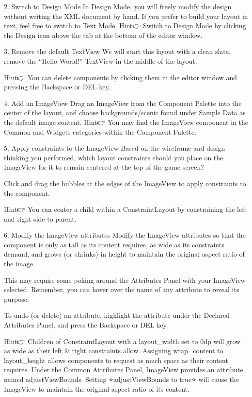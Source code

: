     2. Switch to Design Mode
        In Design Mode, you will freely modify the design without writing the XML document by hand. If you prefer to build your layout in text, feel free to switch to Text Mode.
        Hint👉 Switch to Design Mode by clicking the Design icon above the tab at the bottom of the editor window.

    3. Remove the default TextView
        We will start this layout with a clean slate, remove the “Hello World!” TextView in the middle of the layout.

        Hint👉 You can delete components by clicking them in the editor window and pressing the Backspace or DEL key.

    4. Add an ImageView
        Drag an ImageView from the Component Palette into the center of the layout, and choose backgrounds/scenic found under Sample Data as the default image content.
        Hint👉 You may find the ImageView component in the Common and Widgets categories within the Component Palette.

    5. Apply constraints to the ImageView
        Based on the wireframe and design thinking you performed, which layout constraints should you place on the ImageView for it to remain centered at the top of the game screen?

        Click and drag the bubbles at the edges of the ImageView to apply constraints to the component.

        Hint👉 You can center a child within a ConstraintLayout by constraining the left and right side to parent.

    6. Modify the ImageView attributes
        Modify the ImageView attributes so that the component is only as tall as its content requires, as wide as its constraints demand, and grows (or shrinks) in height to maintain the original aspect ratio of the image.

        This may require some poking around the Attributes Panel with your ImageView selected. Remember, you can hover over the name of any attribute to reveal its purpose.

        To undo (or delete) an attribute, highlight the attribute under the Declared Attributes Panel, and press the Backspace or DEL key.

        Hint👉 Children of ConstraintLayout with a layout_width set to 0dp will grow as wide as their left & right constraints allow.
        Assigning wrap_content to layout_height allows components to request as much space as their content requires.
        Under the Common Attributes Panel, ImageView provides an attribute named adjustViewBounds. Setting ⭐adjustViewBounds to true⭐ will cause the ImageView to maintain the original aspect ratio of its content.

